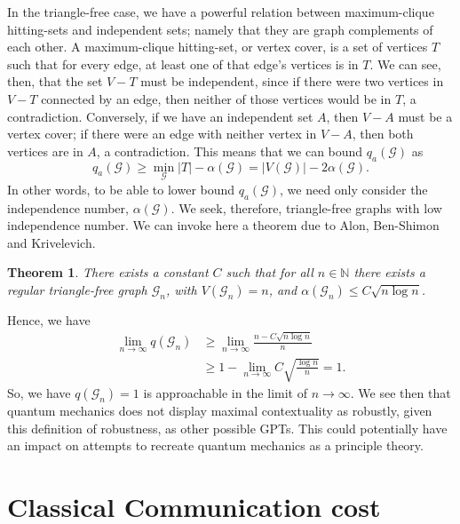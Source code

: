 \documentclass{amsart}
\newtheorem{thm}{Theorem}
\theoremstyle{definition}
\begin{document}
In the triangle-free case, we have a powerful relation between maximum-clique hitting-sets and independent sets; namely that they are graph complements of each other. A maximum-clique hitting-set, or vertex cover, is a set of vertices $T$ such that for every edge, at least one of that edge's vertices is in $T$. We can see, then, that the set $V-T$ must be independent, since if there were two vertices in $V-T$ connected by an edge, then neither of those vertices would be in $T$, a contradiction. Conversely, if we have an independent set $A$, then $V-A$ must be a vertex cover; if there were an edge with neither vertex in $V-A$, then both vertices are in $A$, a contradiction. This means that we can bound $q_a(\mathcal{G})$ as
\begin{equation}
q_a(\mathcal{G})\geq \min_\mathcal{G} |T| - \alpha(\mathcal{G}) = |V(\mathcal{G})|-2\alpha(\mathcal{G}).
\end{equation}
In other words, to be able to lower bound $q_a(\mathcal{G})$, we need only consider the independence number, $\alpha(\mathcal{G})$. We seek, therefore, triangle-free graphs with low independence number. We can invoke here a theorem due to Alon, Ben-Shimon and Krivelevich.\cite{Alon2010}
\begin{thm}
There exists a constant $C$ such that for all $n\in\mathbb{N}$ there exists a regular triangle-free graph $\mathcal{G}_n$, with $V(\mathcal{G}_n)=n$, and $\alpha(\mathcal{G}_n)\leq C\sqrt{n\log n}$.
\end{thm}

Hence, we have
\begin{align}
\lim_{n\rightarrow\infty}q(\mathcal{G}_n)&\geq\lim_{n\rightarrow\infty}\frac{n-C\sqrt{n\log n}}{n}\\
&\geq 1-\lim_{n\rightarrow\infty}C\sqrt{\frac{\log n}{n}}=1.
\end{align}
So, we have $q(\mathcal{G}_n)=1$ is approachable in the limit of $n\rightarrow\infty$. We see then that quantum mechanics does not display maximal contextuality as robustly, given this definition of robustness, as other possible GPTs. This could potentially have an impact on attempts to recreate quantum mechanics as a principle theory.

\FloatBarrier
\section{Classical Communication cost}



{}

\end{document}
